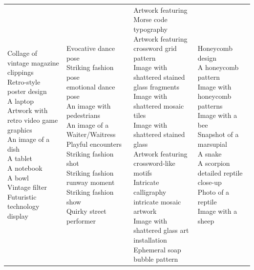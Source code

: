 \documentclass{article}
\begin{document}
\begin{table}[htbp]
\begin{tabular}{|p{4.0cm}|p{4.0cm}|p{4.0cm}|p{4.0cm}|}
\makecell[t]{Collage of vintage magazine clippings \\ Retro-style poster design \\ A laptop \\ Artwork with retro video game graphics \\ An image of a dish \\ A tablet \\ A notebook \\ A bowl \\ Vintage filter \\ Futuristic technology display} & \makecell[t]{Evocative dance pose \\ Striking fashion pose \\ emotional dance pose \\ An image with pedestrians \\ An image of a Waiter/Waitress \\ Playful encounters \\ Striking fashion shot \\ Striking fashion runway moment \\ Striking fashion show \\ Quirky street performer} & \makecell[t]{Artwork featuring Morse code typography \\ Artwork featuring crossword grid pattern \\ Image with shattered stained glass fragments \\ Image with shattered mosaic tiles \\ Image with shattered stained glass \\ Artwork featuring crossword-like motifs \\ Intricate calligraphy \\ intricate mosaic artwork \\ Image with shattered glass art installation \\ Ephemeral soap bubble pattern} & \makecell[t]{Honeycomb design \\ A honeycomb pattern \\ Image with honeycomb patterns \\ Image with a bee \\ Snapshot of a marsupial \\ A snake \\ A scorpion \\ detailed reptile close-up \\ Photo of a reptile \\ Image with a sheep} \\

\end{tabular}
\end{table}
\end{document}
